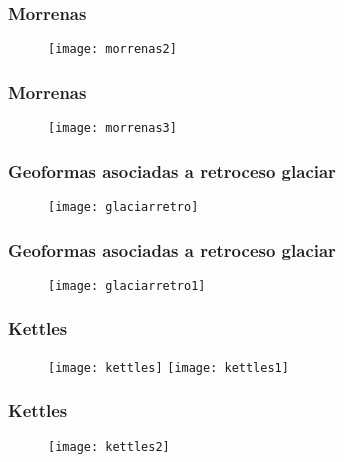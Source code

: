 \documentclass{beamer}
\begin{document}
\begin{frame}
\frametitle{Morrenas}
\begin{figure}
\begin{center}
\texttt{[image: morrenas2]}
\end{center}
\end{figure}
\end{frame}
\begin{frame}
\frametitle{Morrenas}
\begin{figure}
\begin{center}
\texttt{[image: morrenas3]}
\end{center}
\end{figure}
\end{frame}
\begin{frame}
\frametitle{Geoformas asociadas a retroceso glaciar}
\begin{figure}
\begin{center}
\texttt{[image: glaciarretro]}
\end{center}
\end{figure}
\end{frame}
\begin{frame}
\frametitle{Geoformas asociadas a retroceso glaciar}
\begin{figure}
\begin{center}
\texttt{[image: glaciarretro1]}
\end{center}
\end{figure}
\end{frame}
\begin{frame}
\frametitle{Kettles}
\begin{figure}
\begin{center}
\texttt{[image: kettles]}\vfill
\texttt{[image: kettles1]}
\end{center}
\end{figure}
\end{frame}
\begin{frame}
\frametitle{Kettles}
\begin{figure}
\begin{center}
\texttt{[image: kettles2]}
\end{center}
\end{figure}
\end{frame}
\end{document}
